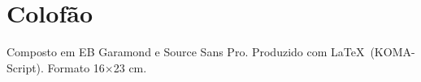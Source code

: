 \chapter*{Colofão}
Composto em EB Garamond e Source Sans Pro. Produzido com \LaTeX\ (KOMA-Script). Formato 16×23 cm.
